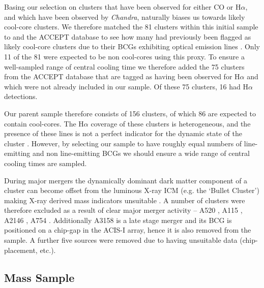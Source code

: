 \documentclass[twocolumn]{aastex6}
\begin{document}
Basing our selection on clusters that have been observed for either CO or H$\alpha$, and which have been observed by {\it Chandra}, naturally biases us towards likely cool-core clusters.  We therefore matched the 81 clusters within this initial sample to \citet[][]{Hogan15a} and the ACCEPT database \citep[][]{Cavagnolo09} to see how many had previously been flagged as likely cool-core clusters due to their BCGs exhibiting optical emission lines \citep[see][]{Crawford99,Cavagnolo08}.  Only 11 of the 81 were expected to be non cool-cores using this proxy.  To ensure a well-sampled range of central cooling time we therefore added the 75 clusters from the ACCEPT database that are tagged as having been observed for H$\alpha$ and which were not already included in our sample.  Of these 75 clusters, 16 had H$\alpha$ detections.

Our parent sample therefore consists of 156 clusters,  of which 86 are expected to contain cool-cores.  The H$\alpha$ coverage of these clusters is heterogeneous, and the presence of these lines is not a perfect indicator for the dynamic state of the cluster \cite[][]{Cavagnolo08}.  However, by selecting our sample to have roughly equal numbers of line-emitting and non line-emitting BCGs we should ensure a wide range of central cooling times are sampled.

During major mergers the dynamically dominant dark matter component of a cluster can become offset from the luminous X-ray ICM (e.g. the `Bullet Cluster') making X-ray derived mass indicators unsuitable \cite[][]{Markevitch02,Clowe06}.  A number of clusters were therefore excluded as a result of clear major merger activity -- A520 \cite[the ``train-wreck'' cluster,][]{Markevitch05}, A115 \cite[][]{Gutierrez05}, A2146 \cite[][]{Russell10,White15}, A754 \cite[][]{Henry95,Macario11}.  Additionally A3158 is a late stage merger \cite[][]{Wang10} and its BCG is positioned on a chip-gap in the ACIS-I array, hence it is also removed from the sample.  A further five sources were removed due to having unsuitable data (chip-placement, etc.).

\subsection{Mass Sample} \label{Section:Mass_Sample}
\end{document}
